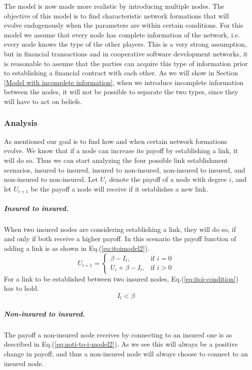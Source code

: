 The model is now made more realistic by introducing multiple nodes. The objective of this model is to find characteristic network formations that will evolve endogenously when the parameters are within certain conditions. 
For this model we assume that every node has complete information of the network, i.e. every node knows the type of the other players. 
This is a very strong assumption, but in financial transactions and in cooperative software development networks, it is reasonable to assume that the parties can acquire this type of information prior to establishing a financial contract with each other. As we will show in Section \ref{Model with incomplete information}, when we introduce incomplete information between the nodes, it will not be possible to separate the two types, since they will have to act on beliefs.
\subsubsection{Analysis}
As mentioned our goal is to find how and when certain network formations evolve. We know that if a node can increase its payoff by establishing a link, it will do so. Thus we can start analyzing the four possible link establishment scenarios, insured to insured, insured to non-insured, non-insured to insured, and non-insured to non-insured. 
Let $U_{i}$ denote the payoff of a node with degree $i$, and let $U_{i+1}$ be the payoff a node will receive if it establishes a new link.
\subparagraph{Insured to insured.}
When two insured nodes are considering establishing a link, they will do so, if and only if both receive a higher payoff.  In this scenario the payoff function of adding a link is as shown in Eq.(\ref{eq:itoimodel2}).
\begin{equation}
    U_{i+1}= 
\begin{cases}
    \beta - I_{l},& \text{if } i = 0\\
    U_{i}+\beta -I_{l},& \text{if }  i>0
   
\end{cases}
\label{eq:itoimodel2}
\end{equation}
For a link to be established between two insured nodes, Eq.(\ref{eq:itoi-condition}) has to hold.
\begin{equation}
I_{l}<\beta
\label{eq:itoi-condition}
\end{equation}
\subparagraph{Non-insured to insured.}
The payoff a non-insured node receives by connecting to an insured one is as described in Eq.(\ref{eq:noti-to-i-model2}). As we see this will always be a positive change in payoff, and thus a non-insured node will always choose to connect to an insured node.
